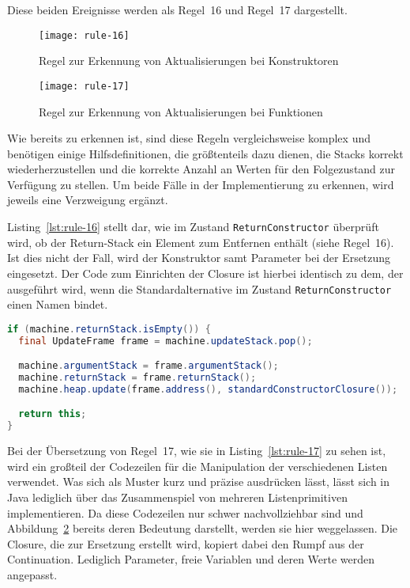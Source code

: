 Diese beiden Ereignisse werden als Regel~16 und Regel~17 dargestellt.

\begin{figure}[h]
  \centering
  \texttt{[image: rule-16]}
  \caption{Regel zur Erkennung von Aktualisierungen bei Konstruktoren}\label{fig:rule-16}
\end{figure}

\begin{figure}[h]
  \centering
  \texttt{[image: rule-17]}
  \caption{Regel zur Erkennung von Aktualisierungen bei Funktionen}\label{fig:rule-17}
\end{figure}

Wie bereits zu erkennen ist, sind diese Regeln vergleichsweise komplex und benötigen einige Hilfsdefinitionen, die größtenteils dazu dienen, die Stacks korrekt wiederherzustellen und die korrekte Anzahl an Werten für den Folgezustand zur Verfügung zu stellen.
Um beide Fälle in der Implementierung zu erkennen, wird jeweils eine Verzweigung ergänzt.

Listing~\ref{lst:rule-16} stellt dar, wie im Zustand \texttt{ReturnConstructor} überprüft wird, ob der Return-Stack ein Element zum Entfernen enthält (siehe Regel~16).
Ist dies nicht der Fall, wird der Konstruktor samt Parameter bei der Ersetzung eingesetzt.
Der Code zum Einrichten der Closure ist hierbei identisch zu dem, der ausgeführt wird, wenn die Standardalternative im Zustand \texttt{ReturnConstructor} einen Namen bindet.

\begin{lstlisting}[language=java, caption={Erkennung von Aktualisierungen bei Konstruktoren}, label={lst:rule-16}]
if (machine.returnStack.isEmpty()) {
  final UpdateFrame frame = machine.updateStack.pop();

  machine.argumentStack = frame.argumentStack();
  machine.returnStack = frame.returnStack();
  machine.heap.update(frame.address(), standardConstructorClosure());

  return this;
}
\end{lstlisting}

Bei der Übersetzung von Regel~17, wie sie in Listing~\ref{lst:rule-17} zu sehen ist, wird ein großteil der Codezeilen für die Manipulation der verschiedenen Listen verwendet.
Was sich als Muster kurz und präzise ausdrücken lässt, lässt sich in Java lediglich über das Zusammenspiel von mehreren Listenprimitiven implementieren.
Da diese Codezeilen nur schwer nachvollziehbar sind und Abbildung~\ref{fig:rule-17} bereits deren Bedeutung darstellt, werden sie hier weggelassen.
Die Closure, die zur Ersetzung erstellt wird, kopiert dabei den Rumpf aus der Continuation.
Lediglich Parameter, freie Variablen und deren Werte werden angepasst.


